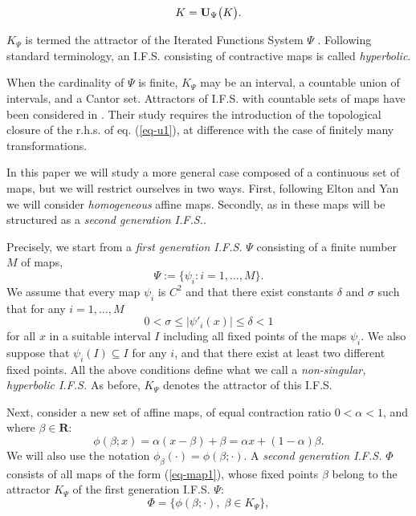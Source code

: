 \documentclass[final,epsfig,amsfont]{article}
\begin{document}
\begin{equation}
K={{\bf U}_{\Psi}}\big(K\big).
\label{eqno(1)}
\end{equation}

$K_\Psi$ is termed the attractor of the Iterated Functions System $\Psi$ \cite{papmor,hut,dem,hata,duvall}.
Following standard terminology, an I.F.S. consisting of contractive maps is called {\em hyperbolic}.

When the cardinality of $\Psi$ is finite, $K_\Psi$ may be an interval, a countable union of intervals, and a Cantor set. Attractors of I.F.S. with
countable sets of maps have been considered in \cite{moran,urba,fernau,molter,hille}. Their study requires the introduction of the topological closure of the r.h.s. of eq. (\ref{eq-u1}), at difference with the case of finitely many transformations.

In this paper we will study a more general case composed of a continuous set of maps, but we will restrict ourselves in two ways. First, following Elton and Yan \cite{elton} we will consider {\em homogeneous} affine maps. Secondly, as in  \cite{nalgo2,arxiv,intj} these maps will be structured as a {\em second generation I.F.S.}.

Precisely, we start from a {\em first generation I.F.S.} $\Psi$ consisting of a finite number $M$ of maps,
\begin{equation}
\Psi:=\{\psi_i: i=1,\ldots,M\}.
\label{eq-map00}
\end{equation}
We assume that every map $\psi_i$ is $C^2$ and that there exist  constants $\delta$ and $\sigma$ such that for any $i=1,\ldots,M$
\begin{equation}
   0 < \sigma \leq |\psi'_i(x)| \leq  \delta < 1
\label{eq-contra}
\end{equation}
for all $x$ in a suitable interval $I$ including all fixed points of the maps $\psi_i$. We also suppose that $\psi_i(I) \subseteq I$ for any $i$, and that there exist at least two different fixed points.
All the above conditions define what we call a {\em non-singular, hyperbolic I.F.S.}
As before, $K_\Psi$ denotes the attractor of this I.F.S.

Next, consider a new set of affine maps, of equal contraction ratio $0 <\alpha<1$, and where $\beta \in {\mathbf R} $:
\begin{equation}
\phi(\beta;x)=\alpha (x-\beta)+\beta=\alpha x +(1-\alpha) \beta.
\label{eq-map1}
\end{equation}
We will also use the notation $\phi_\beta(\cdot) = \phi(\beta;\cdot)$.
A {\em second generation I.F.S.} $\Phi$  consists of all maps of the form (\ref{eq-map1}), whose fixed points $\beta$ belong to the attractor $K_\Psi$ of the first generation I.F.S. $\Psi$:
\begin{equation}
\Phi = \{ \phi(\beta;\cdot), \; \beta \in K_\Psi \},
\label{eq-map1b}
\end{equation}
\end{document}

